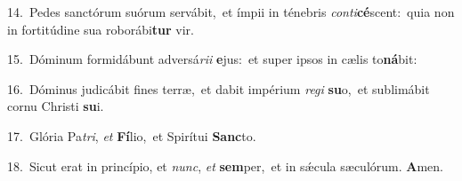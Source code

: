 {\numbfont\textcolor{\numbcolor}{14.}}~Pedes sanctórum suórum servábit,~\dagger et ímpii in ténebris \textit{con}\-\textit{ti}\textbf{cé}scent:~\star quia non in fortitúdine sua roborábi\textbf{tur} vir.\par
{\numbfont\textcolor{\numbcolor}{15.}}~Dóminum formidábunt adversá\-\textit{ri}\-\textit{i} \textbf{e}\-jus:~\star et super ipsos in cælis to\-\textbf{ná}\-bit:\par
{\numbfont\textcolor{\numbcolor}{16.}}~Dóminus judicábit fines terræ,~\dagger et dabit impérium \textit{re}\-\textit{gi} \textbf{su}\-o,~\star et sublimábit cornu Christi \textbf{su}\-i.\par
{\numbfont\textcolor{\numbcolor}{17.}}~Glória Pa\-\textit{tri}\-, \textit{et} \textbf{Fí}\-lio,~\star et Spirítui \textbf{Sanc}\-to.\par
{\numbfont\textcolor{\numbcolor}{18.}}~Sicut erat in princípio, et \textit{nunc}\-, \textit{et} \textbf{sem}\-per,~\star et in sǽcula sæculórum. \textbf{A}\-men.\par
